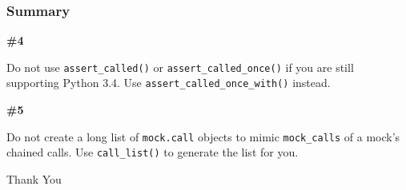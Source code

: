 \documentclass[xcolor={svgnames}]{beamer}
\newcommand{\pycode}[2][]{\lstinline[style=python,#1]{#2}}
\begin{document}
\begin{frame}[t]
    \frametitle{Summary}
    \small
    \textbf{\#4}

    Do not use \pycode{assert_called()} or \pycode{assert_called_once()}
    if you are still supporting Python 3.4. Use
    \pycode{assert_called_once_with()} instead.
    \pause

    \bigskip

    \textbf{\#5}

    Do not create a long list of \pycode{mock.call} objects to mimic
    \pycode{mock_calls} of a mock's chained calls. Use
    \pycode{call_list()} to generate the list for you.
\end{frame}


\begin{frame}
    \begin{center}
        \Huge
        Thank You
    \end{center}
\end{frame}
\end{document}
